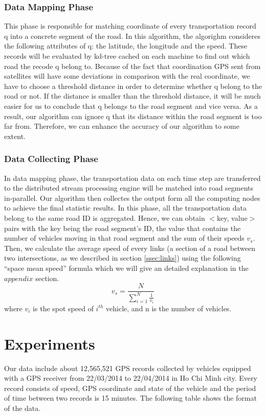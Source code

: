 \documentclass{acm_proc_article-sp}
\begin{document}
\subsubsection{Data Mapping Phase} 
This phase is responsible for matching coordinate of every transportation record q into a concrete segment of the road. In this algorithm, the algorighm consideres the following attributes of q: the latitude, the longitude and the speed. These records will be evaluated by kd-tree cached on each machine to find out which road the recode q belong to. Because of the fact that coordination GPS sent from satellites will have some deviations in comparison with the real coordinate, we have to choose a threshold distance in order to determine whether q belong to the road or not. If the distance is smaller than the threshold distance, it will be much easier for us to conclude that q belongs to the road segment and vice versa. As a result, our algorithm can ignore q that its distance within the road segment is too far from. Therefore, we can enhance the accuracy of our algorithm to some extent.

\subsubsection{Data Collecting Phase} \label{datacollectingphase} In data mapping phase, the transportation data on each time step are transferred to the distributed stream processing engine will be matched into road segments in-parallel. Our algorithm then collectes the output form all the computing nodes to achieve the final statistic results.  In this phase, all the transportation data belong to the same road ID is aggregated. Hence, we can obtain $<$key, value$>$ pairs with the key being the road segment's ID, the value that contains the number of vehicles moving in that road segment and the sum of their speeds $v_{s}$. Then, we calculate the average speed of every links (a section of a road between two intersections, as we described in section \ref{ssec:links}) using the following ``space mean speed'' formula which we will give an detailed explanation in the $appendix$ section.
\[ v_{s} = \frac{N}{\sum_{i=1}^{N}\frac{1}{v_{i}}}\]
where $v_{i}$ is the spot speed of $i^{th}$ vehicle, and n is the number of vehicles.

\section{Experiments}


Our data include about 12,565,521 GPS records collected by vehicles equipped with a GPS receiver from 22/03/2014 to 22/04/2014 in Ho Chi Minh city. Every record consists of speed, GPS coordinate and state of the vehicle and the period of time between two records is 15 minutes. The following table shows the format of the data.
\end{document}
